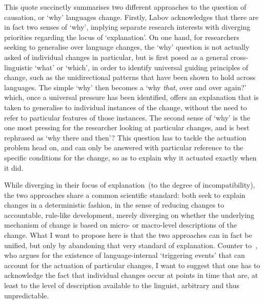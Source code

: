 This quote succinctly summarises two different approaches to the question of causation, or `why' languages change. Firstly, Labov acknowledges that there are in fact two senses of `why', implying separate research interests with diverging priorities regarding the locus of `explanation'. On one hand, for researchers seeking to generalise over language changes, the `why' question is not actually asked of individual changes in particular, but is first posed as a general cross-linguistic `what' or `which', in order to identify universal guiding principles of change, such as the unidirectional patterns that have been shown to hold across languages. The simple `why' then becomes a `why \emph{that}, over and over again?' which, once a universal pressure has been identified, offers an explanation that is taken to generalise to individual instances of the change, without the need to refer to particular features of those instances. The second sense of `why' is the one most pressing for the researcher looking at particular changes, and is best rephrased as `why there and then'? This question has to tackle the actuation problem head on, and can only be answered with particular reference to the specific conditions for the change, so as to explain why it actuated exactly when it did.

While diverging in their focus of explanation~(to the degree of incompatibility), the two approaches share a common scientific standard: both seek to explain changes in a deterministic fashion, in the sense of reducing changes to accountable, rule-like development, merely diverging on whether the underlying mechanism of change is based on micro- or macro-level descriptions of the change. What I want to propose here is that the two approaches can in fact be unified, but only by abandoning that very standard of explanation.
Counter to~\citet[ch.5]{Labov2010}, who argues for the existence of language-internal `triggering events' that can account for the actuation of particular changes, I want to suggest that one has to acknowledge the fact that individual changes occur at points in time that are, at least to the level of description available to the linguist, arbitrary and thus unpredictable.

